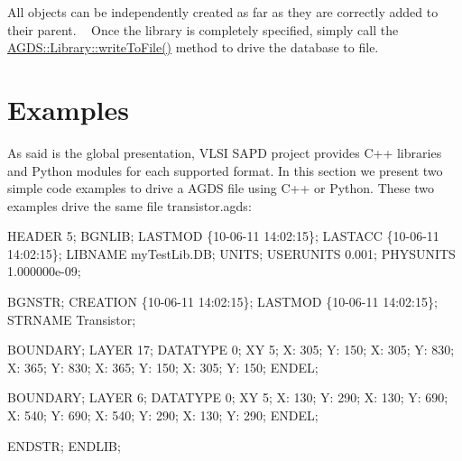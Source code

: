 All objects can be independently created as far as they are correctly added to their parent. ~\newline
Once the library is completely specified, simply call the \hyperlink{class_a_g_d_s_1_1_library_a33b9d989b84857f46034085664ff3fa2}{A\+G\+D\+S\+::\+Library\+::write\+To\+File()} method to drive the database to file.\hypertarget{agds_agdsExamples}{}\section{Examples}\label{agds_agdsExamples}
As said is the global presentation, V\+L\+SI S\+A\+PD project provides C++ libraries and Python modules for each supported format. In this section we present two simple code examples to drive a A\+G\+DS file using C++ or Python. These two examples drive the same file {\ttfamily transistor.\+agds\+:} 
\begin{DoxyCodeInclude}
HEADER 5;
BGNLIB;
  LASTMOD \{10-06-11  14:02:15\};
  LASTACC \{10-06-11  14:02:15\};
LIBNAME myTestLib.DB;
UNITS;
  USERUNITS 0.001;
  PHYSUNITS 1.000000e-09;

BGNSTR;
  CREATION \{10-06-11  14:02:15\};
  LASTMOD  \{10-06-11  14:02:15\};
STRNAME Transistor;

BOUNDARY;
LAYER 17;
DATATYPE 0;
XY 5;
  X: 305;   Y: 150;
  X: 305;   Y: 830;
  X: 365;   Y: 830;
  X: 365;   Y: 150;
  X: 305;   Y: 150;
ENDEL;

BOUNDARY;
LAYER 6;
DATATYPE 0;
XY 5;
  X: 130;   Y: 290;
  X: 130;   Y: 690;
  X: 540;   Y: 690;
  X: 540;   Y: 290;
  X: 130;   Y: 290;
ENDEL;

ENDSTR;
ENDLIB;
\end{DoxyCodeInclude}


